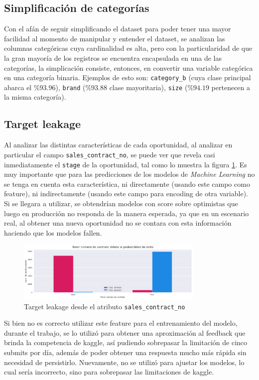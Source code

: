 \documentclass[titlepage,a4paper]{article}
\begin{document}
\subsection{Simplificación de categorías}\label{subsec:simp_cat}
Con el afán de seguir simplificando el dataset para poder tener una mayor facilidad al momento de manipular y entender el dataset, se analizan las columnas categóricas cuya cardinalidad es alta, pero con la particularidad de que la gran mayoría de los registros se encuentra encapsulada en una de las categorías, la simplicación consiste, entonces, en convertir una variable categórica en una categoría binaria. Ejemplos de esto son: \verb|category_b| (cuya clase principal abarca el $\%93.96$), \verb|brand| ($\%93.88$ clase mayoritaria), \verb|size| ($\%94.19$ pertenecen a la misma categoría).


\subsection{Target leakage}\label{subsec:targ_leak}
Al analizar las distintas características de cada oportunidad, al analizar en particular el campo \verb|sales_contract_no|, se puede ver que revela casi inmediatamente el \verb|stage| de la oportunidad, tal como lo muestra la figura \ref{fig:target_leakage}. Es muy importante que para las predicciones de los modelos de \textit{Machine Learning} no se tenga en cuenta esta característica, ni directamente (usando este campo como feature), ni indirectamente (usando este campo para encoding de otra variable). Si se llegara a utilizar, se obtendrían modelos con score sobre optimistas que luego en producción no responda de la manera esperada, ya que en un escenario real, al obtener una nueva oportunidad no se contara con esta información haciendo que los modelos fallen.

\begin{figure}[H]
\includegraphics[width=0.8\textwidth]{images/targ_leak.png}
\cprotect\caption{\label{fig:target_leakage} Target leakage desde el atributo \verb|sales_contract_no|}
\end{figure}

Si bien no es correcto utilizar este feature para el entrenamiento del modelo, durante el trabajo, se lo utilizó para obtener una aproximación al feedback que brinda la competencia de kaggle, así pudiendo sobrepasar la limitación de cinco submits por día, además de poder obtener una respuesta mucho más rápida sin necesidad de persistirlo. Nuevamente, no se utilizó para ajustar los modelos, lo cual sería incorrecto, sino para sobrepasar las limitaciones de kaggle.
\end{document}
